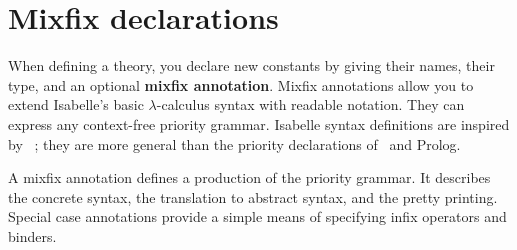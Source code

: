 \section{Mixfix declarations} \label{sec:mixfix}

When defining a theory, you declare new constants by giving their names,
their type, and an optional {\bf mixfix annotation}.  Mixfix annotations
allow you to extend Isabelle's basic $\lambda$-calculus syntax with
readable notation.  They can express any context-free priority grammar.
Isabelle syntax definitions are inspired by \OBJ~\cite{OBJ}; they are more
general than the priority declarations of \ML\ and Prolog.

A mixfix annotation defines a production of the priority grammar.  It
describes the concrete syntax, the translation to abstract syntax, and the
pretty printing.  Special case annotations provide a simple means of
specifying infix operators and binders.

